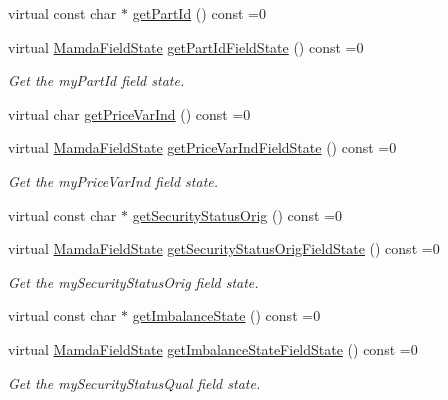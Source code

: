 \begin{CompactItemize}
virtual const char $\ast$ \hyperlink{classWombat_1_1MamdaOrderImbalanceRecap_a6b1ce60263dc71feb68e3387359f31e}{get\-Part\-Id} () const =0
\item 
virtual \hyperlink{namespaceWombat_93aac974f2ab713554fd12a1fa3b7d2a}{Mamda\-Field\-State} \hyperlink{classWombat_1_1MamdaOrderImbalanceRecap_841fcf0b983e68acb4da8b3aad428d47}{get\-Part\-Id\-Field\-State} () const =0
\begin{CompactList}\small\item\em Get the my\-Part\-Id field state. \item\end{CompactList}\item 
virtual char \hyperlink{classWombat_1_1MamdaOrderImbalanceRecap_3aa9b6bbac27f9e29b8a1b9b43b11258}{get\-Price\-Var\-Ind} () const =0
\item 
virtual \hyperlink{namespaceWombat_93aac974f2ab713554fd12a1fa3b7d2a}{Mamda\-Field\-State} \hyperlink{classWombat_1_1MamdaOrderImbalanceRecap_00676cadceeeccb79a6e27f2001580ca}{get\-Price\-Var\-Ind\-Field\-State} () const =0
\begin{CompactList}\small\item\em Get the my\-Price\-Var\-Ind field state. \item\end{CompactList}\item 
virtual const char $\ast$ \hyperlink{classWombat_1_1MamdaOrderImbalanceRecap_50880a888721be863d184627c984125b}{get\-Security\-Status\-Orig} () const =0
\item 
virtual \hyperlink{namespaceWombat_93aac974f2ab713554fd12a1fa3b7d2a}{Mamda\-Field\-State} \hyperlink{classWombat_1_1MamdaOrderImbalanceRecap_562a82c0673ef879851e3bbc2f0ac308}{get\-Security\-Status\-Orig\-Field\-State} () const =0
\begin{CompactList}\small\item\em Get the my\-Security\-Status\-Orig field state. \item\end{CompactList}\item 
virtual const char $\ast$ \hyperlink{classWombat_1_1MamdaOrderImbalanceRecap_380353bc10d950df839870cb6423def3}{get\-Imbalance\-State} () const =0
\item 
virtual \hyperlink{namespaceWombat_93aac974f2ab713554fd12a1fa3b7d2a}{Mamda\-Field\-State} \hyperlink{classWombat_1_1MamdaOrderImbalanceRecap_a9ffa2d99183cc651c0981c0c310eef9}{get\-Imbalance\-State\-Field\-State} () const =0
\begin{CompactList}\small\item\em Get the my\-Security\-Status\-Qual field state. \item\end{CompactList}\item 

\end{CompactItemize}
